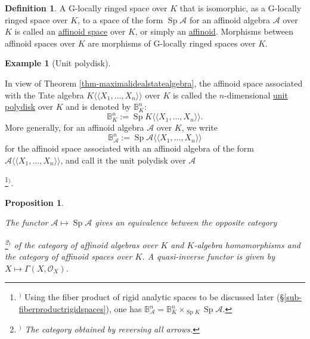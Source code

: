 \documentclass[a4paper,12pt, dvipdfmx]{jsbook}
\def\B{\mathbb{B}}
\def\O{\mathscr{O}}
\def\Sp{\mathop{\mathrm{Sp}}\nolimits}
\def\dl{\langle\!\langle}
\def\dr{\rangle\!\rangle}
\theoremstyle{plain}
\newtheorem{prop}[thm]{\bfseries Proposition}
\theoremstyle{definition}
\newtheorem{dfn}[thm]{\bfseries Definition}
\newtheorem{exa}[thm]{\bfseries Example}
\newcounter{chushaku}
\def\chu#1{\addtocounter{chushaku}{1}\footnote[\value{chushaku}]{${}^)$ #1}${}^)$}
\begin{document}
\begin{dfn}\label{dfn-affinoidspaces}{\rm 
A G-locally ringed space over $K$ that is isomorphic, as a G-locally ringed space over $K$, to a space of the form $\Sp\mathcal{A}$ for an affinoid algebra $\mathcal{A}$ over $K$ is called an \underline{affinoid space} over $K$, or simply an \underline{affinoid}. Morphisms between affinoid spaces over $K$ are morphisms of G-locally ringed spaces over $K$.}
\end{dfn}

\begin{exa}[Unit polydisk]\label{exa-unitball}{\rm {}
In view of Theorem \ref{thm-maximalidealstatealgebra}, the affinoid space associated with the Tate algebra $K\dl X_1,\ldots,X_n\dr$ over $K$ is called the $n$-dimensional \underline{unit polydisk} over $K$ and is denoted by $\B^n_K$:
$$
\B^n_K:=\Sp K\dl X_1,\ldots,X_n\dr.
$$
More generally, for an affinoid algebra $\mathcal{A}$ over $K$, we write
$$
\B^n_{\mathcal{A}}:=\Sp\mathcal{A}\dl X_1,\ldots,X_n\dr
$$
for the affinoid space associated with an affinoid algebra of the form $\mathcal{A}\dl X_1,\ldots,X_n\dr$, and call it the unit polydisk over $\mathcal{A}$\chu{Using the fiber product of rigid analytic spaces to be discussed later (\S\ref{sub-fiberproductrigidspaces}), one has $\B^n_{\mathcal{A}}=\B^n_K\times_{\Sp K}\Sp\mathcal{A}$.}.}
\end{exa}

\begin{prop}\label{prop-affinoidduality}{\rm 
The functor $\mathcal{A}\mapsto\Sp\mathcal{A}$ gives an equivalence between the opposite category\chu{The category obtained by reversing all arrows.} of the category of affinoid algebras over $K$ and $K$-algebra homomorphisms and the category of affinoid spaces over $K$. A quasi-inverse functor is given by $X\mapsto\Gamma(X,\O_X)$.}
\end{prop}
\end{document}
